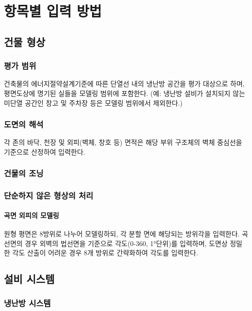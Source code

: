 
\part{항목별 입력 방법}

\chapter{건물 형상}

\section{평가 범위}
건축물의 에너지절약설계기준에 따른 단열선 내의 냉난방 공간을 평가 대상으로 하며, 평면도상에 명기된 실들을 모델링 범위에 포함한다. (예: 냉난방 설비가 설치되지 않는 미단열 공간인 창고 및 주차장 등은 모델링 범위에서 제외한다.) 

\section{도면의 해석}
각 존의 바닥, 천장 및 외피(벽체, 창호 등) 면적은 해당 부위 구조체의 벽체 중심선을 기준으로 산정하여 입력한다.

\section{건물의 조닝}

\section{단순하지 않은 형상의 처리}

\subsection{곡면 외피의 모델링}

원형 평면은 8방위로 나누어 모델링하되, 각 분할 면에 해당되는 방위각을 입력한다. 곡선면의 경우 외벽의 법선면을 기준으로 각도(0-360, 1°단위)를 입력하며, 도면상 정밀한 각도 산출이 어려운 경우 8개 방위로 간략화하여 각도를 입력한다.

\chapter{설비 시스템}

\section{냉난방 시스템}

